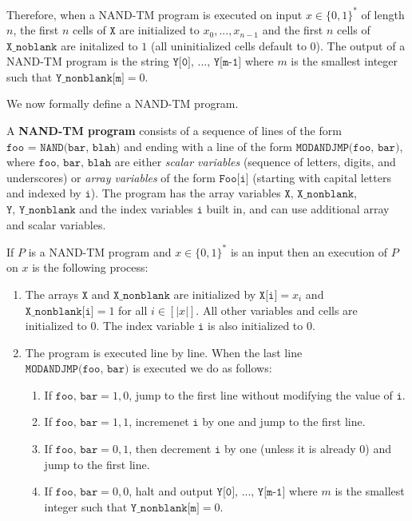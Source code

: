 \begin{enumerate}
  \end{enumerate}
  Therefore, when a NAND-TM program is executed on input $x \in \{0,1\}^*$ of length $n$, the first $n$ cells of $\texttt{X}$ are initialized to $x_0, ..., x_{n-1}$ and the first $n$ cells of $\texttt{X\_noblank}$ are initalized to $1$ (all uninitialized cells default to $0$). The output of a NAND-TM program is the string $\texttt{Y[0], ..., Y[m-1]}$ where $m$ is the smallest integer such that $\texttt{Y\_nonblank[m]} = 0$. 

  We now formally define a NAND-TM program. 

  \begin{definition}
    \label{def:nand-tm-programs}
  A \textbf{NAND-TM program} consists of a sequence of lines of the form $\texttt{foo = NAND(bar, blah)}$ and ending with a line of the form $\texttt{MODANDJMP(foo, bar)}$, where $\texttt{foo, bar, blah}$ are either \textit{scalar variables} (sequence of letters, digits, and underscores) or \textit{array variables} of the form $\texttt{Foo[i]}$ (starting with capital letters and indexed by $\texttt{i}$). The program has the array variables $\texttt{X, X\_nonblank}$, $\texttt{Y, Y\_nonblank}$ and the index variables $\texttt{i}$ built in, and can use additional array and scalar variables. 

  If $P$ is a NAND-TM program and $x \in \{0,1\}^*$ is an input then an execution of $P$ on $x$ is the following process: 
  \begin{enumerate}
      \item The arrays $\texttt{X}$ and $\texttt{X\_nonblank}$ are initialized by $\texttt{X[i]} = x_i$ and $\texttt{X\_nonblank[i]} = 1$ for all $i \in [|x|]$. All other variables and cells are initialized to $0$. The index variable $\texttt{i}$ is also initialized to $0$. 
      \item The program is executed line by line. When the last line $\texttt{MODANDJMP(foo, bar)}$ is executed we do as follows: 
      \begin{enumerate}
          \item If $\texttt{foo, bar} = 1, 0$, jump to the first line without modifying the value of $\texttt{i}$. 
          \item If $\texttt{foo, bar} = 1, 1$, incremenet $\texttt{i}$ by one and jump to the first line. 
          \item If $\texttt{foo, bar} = 0, 1 $, then decrement $\texttt{i}$ by one (unless it is already 0) and jump to the first line. 
          \item If $\texttt{foo, bar} = 0, 0$, halt and output $\texttt{Y[0], ..., Y[m-1]}$ where $m$ is the smallest integer such that $\texttt{Y\_nonblank[m]} = 0$. 
      \end{enumerate}
  \end{enumerate}
  \end{definition}

